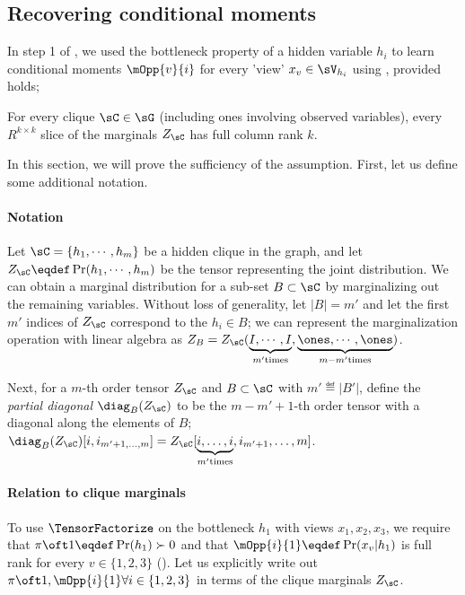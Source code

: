 \subsection{Recovering conditional moments}

In step 1 of \LearnMarginals, we used the bottleneck property of a hidden
  variable $h_i$ to learn conditional moments $\mOpp{v}{i}$ for every
  'view' $x_v \in \sV_{h_i}$ using \TensorFactorize, provided
   holds;
\begin{assumption*}
For every clique $\sC \in \sG$ (including ones involving observed variables),
every $R^{k \times k}$ slice of the marginals $Z_\sC$ has full column rank $k$.
\end{assumption*}

In this section, we will prove the sufficiency of the assumption. First,
  let us define some additional notation.

\paragraph{Notation}

Let $\sC = \{h_1, \cdots, h_m\}$ be a hidden clique in the graph, and
  let $Z_\sC \eqdef \Pr(h_1, \cdots, h_m)$ be the tensor representing the
  joint distribution. 
We can obtain a marginal distribution for a sub-set $B \subset \sC$ by
  marginalizing out the remaining variables. 
Without loss of generality, let $|B| = m'$ and let the first $m'$
  indices of $Z_\sC$ correspond to the $h_i \in B$; we can represent the
  marginalization operation with linear algebra as $Z_B = Z_\sC(
  \underbrace{I, \cdots, I}_{m' \text{times}}, \underbrace{\ones, \cdots, \ones}_{m - m'
  \text{times}} )$. 

Next, for a $m$-th order tensor $Z_\sC$ and $B \subset \sC$ with $m' \eqdef |B'|$, define the {\em
partial diagonal} $\diag_{B}(Z_\sC)$ to be the $m - m' + 1$-th order tensor with
a diagonal along the elements of $B$; $\diag_{B}(Z_\sC)[i, 
i_{m'+1, \ldots, m}] = Z_\sC[\underbrace{i, \ldots, i}_{m' \text{times}}, i_{m'+1}, \ldots, m]$.


\paragraph{Relation to clique marginals}

To use $\TensorFactorize$ on the bottleneck $h_1$ with views $x_1, x_2,
x_3$, we require that $\pi\oft1 \eqdef \Pr(h_1) \succ 0$ and that $\mOpp{i}{1} \eqdef \Pr(x_v | h_1)$ is full
  rank for every $v \in \{1,2,3\}$ ().
Let us explicitly write out $\pi\oft1, \mOpp{i}{1} \forall i \in
  \{1,2,3\}$ in terms of the clique marginals $Z_\sC$.

